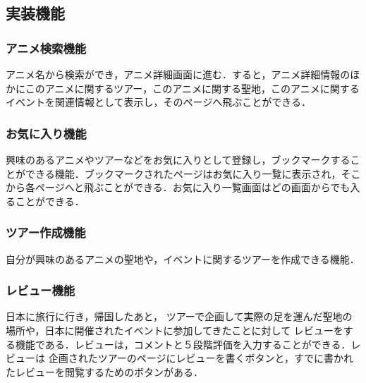 \subsection{実装機能}


\subsubsection{アニメ検索機能}
\par
アニメ名から検索ができ，アニメ詳細画面に進む．すると，アニメ詳細情報のほかにこのアニメに関するツアー，このアニメに関する聖地，このアニメに関するイベントを関連情報として表示し，そのページへ飛ぶことができる．

\subsubsection{お気に入り機能}
\par
興味のあるアニメやツアーなどをお気に入りとして登録し，ブックマークすることができる機能．ブックマークされたページはお気に入り一覧に表示され，そこから各ページへと飛ぶことができる．お気に入り一覧画面はどの画面からでも入ることができる．


\subsubsection{ツアー作成機能}
\par
自分が興味のあるアニメの聖地や，イベントに関するツアーを作成できる機能．

\subsubsection{レビュー機能}
\par
日本に旅行に行き，帰国したあと，
ツアーで企画して実際の足を運んだ聖地の場所や，日本に開催されたイベントに参加してきたことに対して
レビューをする機能である．レビューは，コメントと５段階評価を入力することができる．レビューは
企画されたツアーのページにレビューを書くボタンと，すでに書かれたレビューを閲覧するためのボタンがある．
